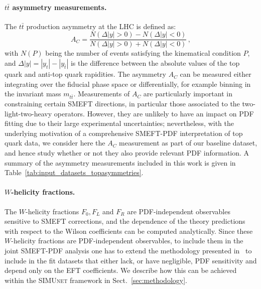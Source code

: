 \documentclass[withindex,glossary]{cam-thesis}
\newcommand{\simunet}{\textsc{SIMUnet}}
\begin{document}



 \paragraph{$t\bar{t}$ asymmetry measurements.} The $t\bar{t}$ production asymmetry
 at the LHC is defined as:
 \begin{equation}
   \label{eq:ac}
A_C = \frac{N(\Delta |y| > 0) - N(\Delta |y| < 0)}{N(\Delta |y| > 0) + N(\Delta |y| < 0)} \, ,
\end{equation}
with $N(P)$ being the number of events satisfying the kinematical condition $P$, and $\Delta |y| = |y_t| - |y_{\bar{t}}|$ is the difference between the absolute values of the top quark and anti-top quark rapidities.
%
The asymmetry $A_C$ can be measured either integrating over the fiducial phase space
or differentially, for example binning in the invariant mass $m_{t\bar{t}}$.
%
Measurements of $A_C$ are particularly important in constraining certain SMEFT directions,
in particular those associated to the two-light-two-heavy operators.
%
However, they are unlikely to have an impact on PDF fitting due to their large
experimental uncertainties; nevertheless, with the underlying 
motivation of a comprehensive SMEFT-PDF interpretation
of top quark data, we consider here the $A_C$ measurement as part of our baseline dataset,
and hence study whether or not they also provide relevant PDF information. 
% 
A summary of the asymmetry measurements included in this work is given in Table~\ref{tab:input_datasets_topasymmetries}.



\paragraph{$W$-helicity fractions.}
%
The $W$-helicity fractions $F_0, F_L$ and $F_R$ are PDF-independent observables
sensitive to SMEFT corrections, and the dependence of the theory predictions
with respect to the Wilson coefficients can be computed
analytically.
%
Since these $W$-helicity fractions are PDF-independent observables, to include them
in the joint SMEFT-PDF analysis one has to extend the methodology presented in~\cite{Iranipour:2022iak}
to include in the fit datasets that either lack, or have negligible, PDF sensitivity
and depend only on the EFT coefficients.
%
We describe how this can be achieved within the \simunet{} framework
in Sect.~\ref{sec:methodology}. 
\end{document}
